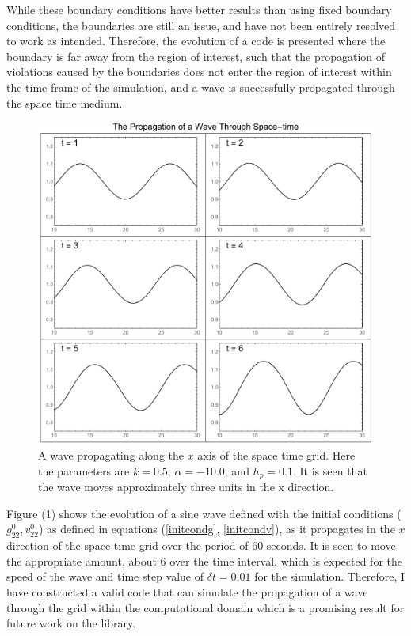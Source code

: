 \documentclass[11pt]{article}
\numberwithin{equation}{section}
\begin{document}
While these boundary conditions have better results than using fixed boundary conditions, the boundaries are still an issue, and have not been entirely resolved to work as intended. Therefore, the evolution of a code is presented where the boundary is far away from the region of interest, such that the propagation of violations caused by the boundaries does not enter the region of interest within the time frame of the simulation, and a wave is successfully propagated through the space time medium. 

\begin{figure}[H]\label{wave}
\includegraphics[width=\textwidth]{wavearray}
\caption{A wave propagating along the $x$ axis of the space time grid. Here the parameters are $k = 0.5$, $\alpha = -10.0$, and $h_p = 0.1$. It is seen that the wave moves approximately three units in the x direction.}
\end{figure}
Figure (1) shows the evolution of a sine wave defined with the initial conditions ($g^0_{22}, v^0_{22}$) as defined in equations (\ref{initcondg}, \ref{initcondv}), as it propagates in the $x$ direction of the space time grid over the period of $60$ seconds. It is seen to move the appropriate amount, about $6$ over the time interval, which is expected for the speed of the wave and time step value of $\delta t = 0.01$ for the simulation. Therefore, I have constructed a valid code that can simulate the propagation of a wave through the grid within the computational domain which is a promising result for future work on the library.
\end{document}
